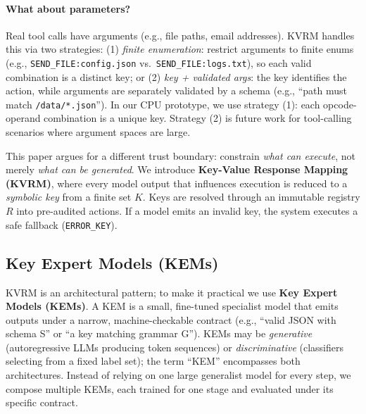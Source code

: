 \documentclass[11pt]{article}
\begin{document}
\paragraph{What about parameters?}
Real tool calls have arguments (e.g., file paths, email addresses). KVRM handles this via two strategies: (1) \emph{finite enumeration}: restrict arguments to finite enums (e.g., \texttt{SEND\_FILE:config.json} vs.\ \texttt{SEND\_FILE:logs.txt}), so each valid combination is a distinct key; or (2) \emph{key + validated args}: the key identifies the action, while arguments are separately validated by a schema (e.g., ``path must match \texttt{/data/*.json}''). In our CPU prototype, we use strategy (1): each opcode-operand combination is a unique key. Strategy (2) is future work for tool-calling scenarios where argument spaces are large.

This paper argues for a different trust boundary: constrain \emph{what can execute}, not merely \emph{what can be generated}.
We introduce \textbf{Key-Value Response Mapping (KVRM)}, where every model output that influences execution is reduced to a \emph{symbolic key} from a finite set $K$.
Keys are resolved through an immutable registry $R$ into pre-audited actions. If a model emits an invalid key, the system executes a safe fallback (\texttt{ERROR\_KEY}).

\subsection{Key Expert Models (KEMs)}
KVRM is an architectural pattern; to make it practical we use \textbf{Key Expert Models (KEMs)}.
A KEM is a small, fine-tuned specialist model that emits outputs under a narrow, machine-checkable contract (e.g., ``valid JSON with schema S'' or ``a key matching grammar G'').
KEMs may be \emph{generative} (autoregressive LLMs producing token sequences) or \emph{discriminative} (classifiers selecting from a fixed label set); the term ``KEM'' encompasses both architectures.
Instead of relying on one large generalist model for every step, we compose multiple KEMs, each trained for one stage and evaluated under its specific contract.
\end{document}
